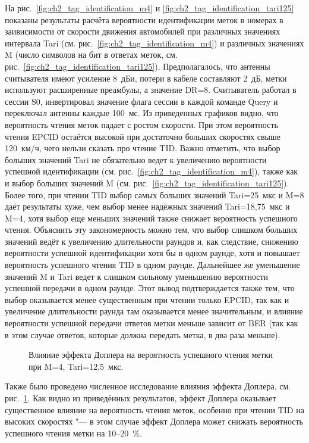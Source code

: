 На рис.~\ref{fig:ch2_tag_identification_m4} и \ref{fig:ch2_tag_identification_tari125} показаны результаты расчёта вероятности идентификации меток в номерах в заивисимости от скорости движения автомобилей при различных значениях интервала Tari (см. рис.~\ref{fig:ch2_tag_identification_m4}) и различных значениях M (число символов на бит в ответах меток, см. рис.~\ref{fig:ch2_tag_identification_tari125}). Предполагалось, что антенны считывателя имеют усиление 8~дБи, потери в кабеле составляют 2~дБ, метки используют расширенные преамбулы, а значение DR=8. Считыватель работал в сессии S0, инвертировал значение флага сессии в каждой команде Query и переключал антенны каждые 100~мс. Из приведенных графиков видно, что вероятность чтения меток падает с ростом скорости. При этом вероятность чтения EPCID остаётся высокой при достаточно больших скоростях свыше 120~км/ч, чего нельзи сказать про чтение TID. Важно отметить, что выбор больших значений Tari не обязательно ведет к увеличению вероятности успешной идентификации (см. рис.~\ref{fig:ch2_tag_identification_m4}), также как и выбор больших значений M (см. рис.~\ref{fig:ch2_tag_identification_tari125}). Более того, при чтении TID выбор самых больших значений Tari=25~мкс и M=8 даёт результаты хуже, чем выбор менее надёжных значений Tari=18,75~мкс и M=4, хотя выбор еще меньших значений также снижает вероятность успешного чтения. Объяснить эту закономерность можно тем, что выбор слишком больших значений ведёт к увеличению длительности раундов и, как следствие, снижению вероятности успешной идентификации хотя бы в одном раунде, хотя и повышает вероятность успешного чтения TID в одном раунде. Дальнейшее же уменьшение значений M и Tari ведет к слишком сильному уменьшению вероятности успешной передачи в одном раунде. Этот вывод подтверждается также тем, что выбор оказывается менее существенным при чтении только EPCID, так как и увеличение длительности раунда там оказывается менее значительным, и влияние вероятности успешной передачи ответов метки меньше зависит от BER (так как в этом случае ответов, которые должна передать метка, в два раза меньше).

\begin{figure}[!t]
	\caption{Влияние эффекта Доплера на вероятность успешного чтения метки при M=4, Tari=12,5~мкс.}
	\label{fig:ch2_identification_doppler}
\end{figure}

Также было проведено численное исследование влияния эффекта Доплера, см. рис.~\ref{fig:ch2_identification_doppler}. Как видно из приведённых результатов, эффект Доплера оказывает существенное влияние на вероятность чтения меток, особенно при чтении TID на высоких скоростях "--- в этом случае эффект Доплера может снижать вероятность успешного чтения метки на 10--20~\%.

